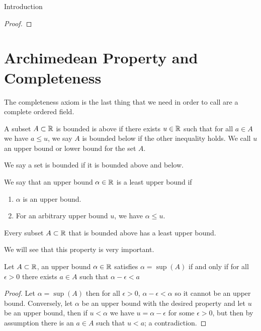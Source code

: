 \begin{chapter}{Introduction}
\begin{proof}
    \end{proof}


    \section{Archimedean Property and Completeness} 

    The completeness axiom is the last thing that we need in order to call are a complete ordered field. 


    
    \begin{defn}
        A subset $A \subset \mathbb{R}$ is bounded is above if there exists $u \in \mathbb{R}$ such that for all $a \in A$ we have 
        $a \leq u$, we say $A$ is bounded below if the other inequality holds. We call $u$ an upper bound or lower bound 
        for the set $A$. 
    \end{defn}

    We say a set is bounded if it is bounded above and below. 

    
    \begin{defn}
        We say that an upper bound $\alpha \in \mathbb{R}$ is a least upper bound if 
        \begin{enumerate}
            \item $\alpha $ is an upper bound. 
            \item For an arbitrary upper bound $u$, we have $\alpha \leq u$.
        \end{enumerate}
    \end{defn}

    
    \begin{defn}
        Every subset $A \subset \mathbb{R}$ that is bounded above has a least upper bound. 
    \end{defn}

    We will see that this property is very important. 

    
    
    \begin{thm}
        Let $A \subset \mathbb{R}$, an upper bound $\alpha \in \mathbb{R}$ satisfies $\alpha = \sup(A)$ if and only if for all $\epsilon > 0$ there exists $a \in A$ such that $\alpha - \epsilon < a$
    \end{thm}

    
    \begin{proof}
        Let $\alpha = \sup(A)$ then for all $\epsilon > 0$, $\alpha - \epsilon < \alpha$ so it cannot be an upper bound. Conversely, let $\alpha $ be an upper bound with the desired property 
        and let $u$ be an upper bound, then if $u < \alpha$ we have $u = \alpha - \epsilon$ for some $\epsilon > 0$, but then by assumption there is an $a \in A$ such that $u < a$; 
        a contradiction. 
    \end{proof}



\end{chapter}

